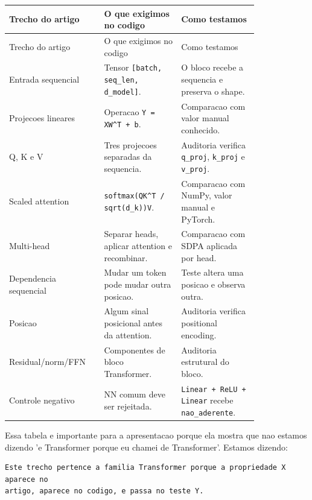 \begin{longtable}{@{}>{\RaggedRight\arraybackslash}p{0.273\linewidth}>{\RaggedRight\arraybackslash}p{0.273\linewidth}>{\RaggedRight\arraybackslash}p{0.273\linewidth}@{}}
\toprule
Trecho do artigo & O que exigimos no codigo & Como testamos \\
\midrule
\endfirsthead
\toprule
Trecho do artigo & O que exigimos no codigo & Como testamos \\
\midrule
\endhead
Entrada sequencial & Tensor \texttt{[batch, seq\_\allowbreak{}len, d\_\allowbreak{}model]}. & O bloco recebe a sequencia e preserva o shape. \\
Projecoes lineares & Operacao \texttt{Y = XW\textasciicircum{}T + b}. & Comparacao com valor manual conhecido. \\
Q, K e V & Tres projecoes separadas da sequencia. & Auditoria verifica \texttt{q\_\allowbreak{}proj}, \texttt{k\_\allowbreak{}proj} e \texttt{v\_\allowbreak{}proj}. \\
Scaled attention & \texttt{softmax(QK\textasciicircum{}T /\allowbreak{} sqrt(d\_\allowbreak{}k))V}. & Comparacao com NumPy, valor manual e PyTorch. \\
Multi-head & Separar heads, aplicar attention e recombinar. & Comparacao com SDPA aplicada por head. \\
Dependencia sequencial & Mudar um token pode mudar outra posicao. & Teste altera uma posicao e observa outra. \\
Posicao & Algum sinal posicional antes da attention. & Auditoria verifica positional encoding. \\
Residual/norm/FFN & Componentes de bloco Transformer. & Auditoria estrutural do bloco. \\
Controle negativo & NN comum deve ser rejeitada. & \texttt{Linear + ReLU + Linear} recebe \texttt{nao\_\allowbreak{}aderente}. \\
\bottomrule
\end{longtable}




Essa tabela e importante para a apresentacao porque ela mostra que nao estamos dizendo 'e Transformer porque eu chamei de Transformer'. Estamos dizendo:



\begin{Verbatim}[fontsize=\small,breaklines=true,label=text]
Este trecho pertence a familia Transformer porque a propriedade X aparece no
artigo, aparece no codigo, e passa no teste Y.
\end{Verbatim}







